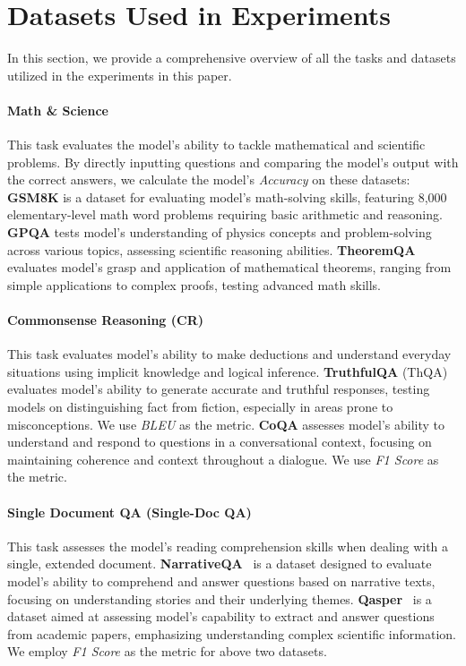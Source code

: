 \section{Datasets Used in Experiments}
\label{app:datasets}
In this section, we provide a comprehensive overview of all the tasks and datasets utilized in the experiments in this paper.
\paragraph{Math \& Science} This task evaluates the model's ability to tackle mathematical and scientific problems. By directly inputting questions and comparing the model's output with the correct answers, we calculate the model's \textit{Accuracy} on these datasets: \textbf{GSM8K} is a dataset for evaluating model's math-solving skills, featuring 8,000 elementary-level math word problems requiring basic arithmetic and reasoning. \textbf{GPQA} tests model's understanding of physics concepts and problem-solving across various topics, assessing scientific reasoning abilities. \textbf{TheoremQA} evaluates model's grasp and application of mathematical theorems, ranging from simple applications to complex proofs, testing advanced math skills.
\paragraph{Commonsense Reasoning (CR)} This task evaluates model's ability to make deductions and understand everyday situations using implicit knowledge and logical inference. \textbf{TruthfulQA} (ThQA) evaluates model's ability to generate accurate and truthful responses, testing models on distinguishing fact from fiction, especially in areas prone to misconceptions. We use \textit{BLEU} as the metric. \textbf{CoQA} assesses model's ability to understand and respond to questions in a conversational context, focusing on maintaining coherence and context throughout a dialogue. We use \textit{F1 Score} as the metric.

\paragraph{Single Document QA (Single-Doc QA)} This task assesses the model's reading comprehension skills when dealing with a single, extended document. \textbf{NarrativeQA}~\cite{DBLP:journals/tacl/KociskySBDHMG18} is a dataset designed to evaluate model's ability to comprehend and answer questions based on narrative texts, focusing on understanding stories and their underlying themes. \textbf{Qasper}~\cite{DBLP:conf/naacl/DasigiLBCSG21} is a dataset aimed at assessing model's capability to extract and answer questions from academic papers, emphasizing understanding complex scientific information. We employ \textit{F1 Score} as the metric for above two datasets.

